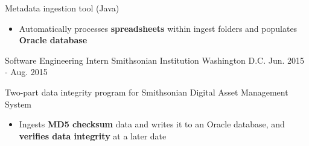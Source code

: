 \begin{cventries}
{\begin{cvitems}
\begin{itemize}
        \end{itemize}
		\item{Metadata ingestion tool (Java)}
        \begin{itemize}
			\item{Automatically processes \textbf{spreadsheets} within ingest folders and populates \textbf{Oracle database}}
        \end{itemize}
        \end{cvitems}
    }
    \cventry
    {Software Engineering Intern}
    {Smithsonian Institution}
    {Washington D.C.}
    {Jun. 2015 - Aug. 2015}
    {
      \begin{cvitems}
	  \item {Two-part data integrity program for Smithsonian Digital Asset Management System}
        \begin{itemize}
			\item {Ingests \textbf{MD5 checksum} data and writes it to an Oracle database, and \textbf{verifies data integrity} at a later date}
        \end{itemize}
      \end{cvitems}
    }
	\vspace{-1.0em}
\end{cventries}
